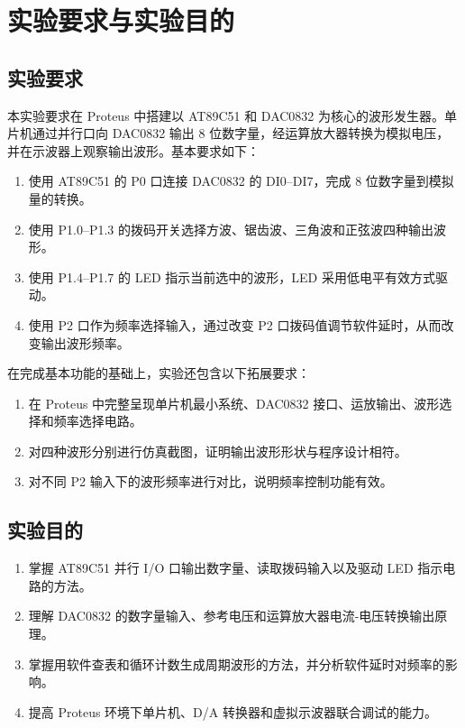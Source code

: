 ﻿\section{实验要求与实验目的}

\subsection{实验要求}
本实验要求在 Proteus 中搭建以 AT89C51 和 DAC0832 为核心的波形发生器。单片机通过并行口向 DAC0832 输出 8 位数字量，经运算放大器转换为模拟电压，并在示波器上观察输出波形。基本要求如下：
\begin{enumerate}
  \item 使用 AT89C51 的 P0 口连接 DAC0832 的 DI0--DI7，完成 8 位数字量到模拟量的转换。
  \item 使用 P1.0--P1.3 的拨码开关选择方波、锯齿波、三角波和正弦波四种输出波形。
  \item 使用 P1.4--P1.7 的 LED 指示当前选中的波形，LED 采用低电平有效方式驱动。
  \item 使用 P2 口作为频率选择输入，通过改变 P2 口拨码值调节软件延时，从而改变输出波形频率。
\end{enumerate}

在完成基本功能的基础上，实验还包含以下拓展要求：
\begin{enumerate}
  \item 在 Proteus 中完整呈现单片机最小系统、DAC0832 接口、运放输出、波形选择和频率选择电路。
  \item 对四种波形分别进行仿真截图，证明输出波形形状与程序设计相符。
  \item 对不同 P2 输入下的波形频率进行对比，说明频率控制功能有效。
\end{enumerate}

\subsection{实验目的}
\begin{enumerate}
  \item 掌握 AT89C51 并行 I/O 口输出数字量、读取拨码输入以及驱动 LED 指示电路的方法。
  \item 理解 DAC0832 的数字量输入、参考电压和运算放大器电流-电压转换输出原理。
  \item 掌握用软件查表和循环计数生成周期波形的方法，并分析软件延时对频率的影响。
  \item 提高 Proteus 环境下单片机、D/A 转换器和虚拟示波器联合调试的能力。
\end{enumerate}

